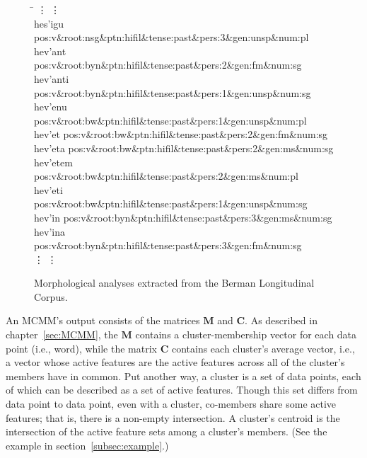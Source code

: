 \begin{figure}[t]
\begin{mdframed}
\begin{tabbing}
\hspace{1in} \= \hspace{5.5in} \kill
\vdots \> \vdots \\
hes\a'{i}gu \> pos:v\&root:nsg\&ptn:hifil\&tense:past\&pers:3\&gen:unsp\&num:pl \\
hev\a'{a}nt \> pos:v\&root:byn\&ptn:hifil\&tense:past\&pers:2\&gen:fm\&num:sg \\
hev\a'{a}nti \> pos:v\&root:byn\&ptn:hifil\&tense:past\&pers:1\&gen:unsp\&num:sg \\
hev\a'{e}nu \> pos:v\&root:bw\&ptn:hifil\&tense:past\&pers:1\&gen:unsp\&num:pl \\
hev\a'{e}t \> pos:v\&root:bw\&ptn:hifil\&tense:past\&pers:2\&gen:fm\&num:sg \\
hev\a'{e}ta \> pos:v\&root:bw\&ptn:hifil\&tense:past\&pers:2\&gen:ms\&num:sg \\
hev\a'{e}tem \> pos:v\&root:bw\&ptn:hifil\&tense:past\&pers:2\&gen:ms\&num:pl \\
hev\a'{e}ti \> pos:v\&root:bw\&ptn:hifil\&tense:past\&pers:1\&gen:unsp\&num:sg \\
hev\a'{i}n \> pos:v\&root:byn\&ptn:hifil\&tense:past\&pers:3\&gen:ms\&num:sg \\
hev\a'{i}na \> pos:v\&root:byn\&ptn:hifil\&tense:past\&pers:3\&gen:fm\&num:sg \\
\vdots \> \vdots \\
\end{tabbing}
\caption{Morphological analyses extracted from the Berman Longitudinal Corpus.}
\label{fig:analyses}
\end{mdframed}
\end{figure}


An MCMM's output consists of 
the matrices $\mathbf{M}$ and $\mathbf{C}$. As described in chapter~\ref{sec:MCMM}, the $\mathbf{M}$ contains a cluster-membership vector for each data point (i.e., word), while the matrix $\mathbf{C}$ contains each cluster's average vector, i.e., a vector whose active features are the active features across all of the cluster's members have in common. Put another way, a cluster is a set of data points, each of which can be described as a set of active features. Though this set differs from data point to data point, even with a cluster, co-members share some active features; that is, there is a non-empty intersection.  A cluster's centroid is the intersection of the active feature sets among a cluster's members.
(See the example in section~\ref{subsec:example}.) 

